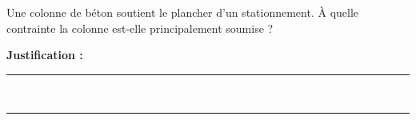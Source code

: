 Une colonne de béton soutient le plancher d'un stationnement. À quelle contrainte la colonne est-elle principalement soumise ?

\choices

\noindent\textbf{Justification :} \hrulefill \\[2.5ex]
\rule{\linewidth}{0.4pt} \\[2.5ex]
\rule{\linewidth}{0.4pt}
\vfill
